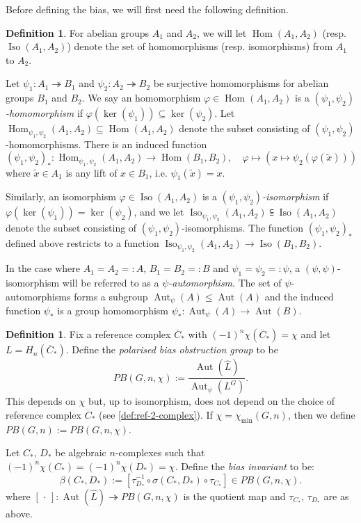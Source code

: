 \documentclass[11pt,a4paper,leqno]{amsart}
\theoremstyle{definition}
\newtheorem{definition}[theorem]{Definition}
\theoremstyle{remark}
\newcommand{\wh}{\widehat}
\newcommand{\wt}{\widetilde}
\newcommand{\ol}{\overline}
\DeclareMathOperator{\Aut}{Aut}
\DeclareMathOperator{\Hom}{Hom}
\DeclareMathOperator{\Iso}{Iso}
\begin{document}
Before defining the bias, we will first need the following definition. 

\begin{definition} \label{def:psi-auto}  For abelian groups $A_1$ and $A_2$, we will let $\Hom(A_1,A_2)$ (resp. $\Iso(A_1,A_2)$) denote the set of homomorphisms (resp. isomorphisms) from $A_1$ to $A_2$.

Let $\psi_1\colon A_1 \twoheadrightarrow B_1$ and $\psi_2\colon A_2 \twoheadrightarrow B_2$ be surjective homomorphisms for abelian groups $B_1$ and $B_2$.
We say an homomorphism $\varphi \in \Hom(A_1,A_2)$ is a \textit{$(\psi_1,\psi_2)$-homomorphism} if $\varphi(\ker(\psi_1)) \subseteq \ker(\psi_2)$.
Let $\Hom_{\psi_1,\psi_2}(A_1,A_2) \subseteq \Hom(A_1,A_2)$ denote the subset consisting of $(\psi_1,\psi_2)$-homomorphisms. 
There is an induced function
\[ (\psi_1,\psi_2)_*\colon \Hom_{\psi_1,\psi_2}(A_1,A_2)  \to \Hom(B_1,B_2), \quad \varphi \mapsto (x \mapsto \psi_2(\varphi(\wt x))) \]
where $\wt x \in A_1$ is any lift of $x \in B_1$, i.e. $\psi_1(\wt x) = x$.

Similarly, an isomorphism $\varphi \in \Iso(A_1,A_2)$ is a \textit{$(\psi_1,\psi_2)$-isomorphism} if $\varphi(\ker(\psi_1)) = \ker(\psi_2)$, and we let $\Iso_{\psi_1,\psi_2}(A_1,A_2) \subseteqq \Iso(A_1,A_2)$ denote the subset consisting of $(\psi_1,\psi_2)$-isomorphisms. The function $(\psi_1,\psi_2)_*$ defined above restricts to a function $\Iso_{\psi_1,\psi_2}(A_1,A_2)  \to \Iso(B_1,B_2)$.



In the case where $A_1=A_2=:A$, $B_1=B_2=:B$ and $\psi_1=\psi_2=:\psi$, a $(\psi,\psi)$-isomorphism will be referred to as a \textit{$\psi$-automorphism}. The set of $\psi$-automorphisms forms a subgroup $\Aut_\psi(A) \le \Aut(A)$ and the induced function $\psi_*$ is a group homomorphism
$\psi_*\colon \Aut_{\psi}(A)  \to \Aut(B)$.
\end{definition}

\begin{definition} \label{def:bias-schafer}
Fix a reference complex $\ol{C}_*$ with $(-1)^n\chi(\ol{C}_*) = \chi$ and let $L = H_n(\ol{C}_*)$. Define the \textit{polarised bias obstruction group} to be
\[ PB(G,n,\chi) := \frac{\Aut(\wh L)}{\Aut_\psi(L^G)}. \]
This depends on $\chi$ but, up to isomorphism, does not depend on the choice of reference complex $\ol{C}_*$ (see \cref{def:ref-2-complex}). If $\chi = \chi_{\min}(G,n)$, then we define $PB(G,n) := PB(G,n,\chi)$.

Let $C_*$, $D_*$ be algebraic $n$-complexes such that $(-1)^n\chi(C_*) = (-1)^n\chi(D_*) = \chi$.
	Define the \textit{bias invariant} to be:
\[ \beta(C_*,D_*) := [\tau_{D_*}^{-1} \circ \sigma(C_*,D_*) \circ \tau_{C_*}] \in PB(G,n,\chi). \] 
where $[\,\cdot\,]\colon \Aut(\wh L) \twoheadrightarrow PB(G,n,\chi)$ is the quotient map and $\tau_{C_*}$, $\tau_{D_*}$ are as above.
\end{definition}
\end{document}
